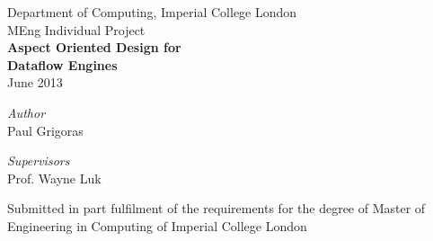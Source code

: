 \begin{titlepage}

\begin{center}

{\Large Department of Computing, Imperial College London}
\HRule \\[0.4cm]
{\Large MEng Individual Project} \\ [5cm]

{\huge \bfseries Aspect Oriented Design for \\[0.25cm]Dataflow Engines}\\[0.5cm]
{\Large June 2013} \\ [3cm]

\begin{minipage}[t]{0.4\textwidth}
\begin{flushleft} \large
\emph{Author} \\[0.5cm]
{Paul Grigoras} \\[0.5cm]

\end{flushleft}
\end{minipage}
\begin{minipage}[t]{0.4\textwidth}
\begin{flushright} \large
\emph{Supervisors} \\[0.5cm]
Prof. Wayne Luk \\[0.3cm]
\end{flushright}
\end{minipage}

\vfill

\begin{minipage}{0.75\textwidth}
\begin{center}
Submitted in part fulfilment of the requirements for the degree of
Master of Engineering in Computing of Imperial College London
\end{center}
\end{minipage}

\end{center}
\end{titlepage}
